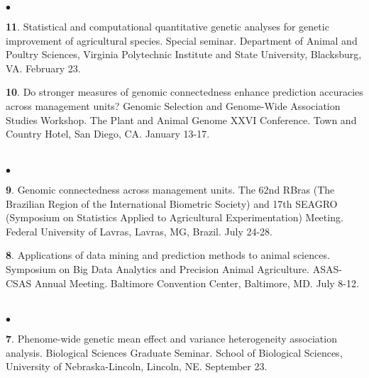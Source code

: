\documentclass[margin,line,10pt]{res}
\newenvironment{list2}{
  \begin{list}{$\bullet$}{%
      \setlength{\itemsep}{0in}
      \setlength{\parsep}{0in} \setlength{\parskip}{0in}
      \setlength{\topsep}{0in} \setlength{\partopsep}{0in} 
      \setlength{\leftmargin}{0.2in}}}{\end{list}}
\begin{document}
\begin{resume}
\begin{list2}
    \vspace{0.5cm}
    
\item [{\bf 11}.]  Statistical and computational quantitative genetic analyses for genetic improvement of agricultural species. Special seminar.  Department of Animal and Poultry Sciences, Virginia Polytechnic Institute and State University, Blacksburg, VA. February 23.

  \vspace{0.5cm}
  
\item [{\bf 10}.] Do stronger measures of genomic connectedness enhance prediction accuracies across management units?  Genomic Selection and Genome-Wide Association Studies Workshop. The Plant and Animal Genome XXVI Conference. Town and Country Hotel, San Diego, CA. January 13-17. 
  
\end{list2}


\section{}
\begin{list2}
\item [{\bf 9}.] Genomic connectedness across management units. The 62nd RBras (The Brazilian Region of the International Biometric Society) and 17th SEAGRO (Symposium on Statistics Applied to Agricultural Experimentation) Meeting. Federal University of Lavras, Lavras, MG, Brazil. July 24-28. 
  
  \vspace{0.5cm}
  
  \item [{\bf 8}.] Applications of data mining and prediction methods to animal sciences. Symposium on Big Data Analytics and Precision Animal Agriculture. ASAS-CSAS Annual Meeting. Baltimore Convention Center, Baltimore, MD. July 8-12. 
  
\end{list2}



\section{}
\begin{list2}
\item [{\bf 7}.] Phenome-wide genetic mean effect and variance heterogeneity association analysis. Biological Sciences Graduate Seminar. School of Biological Sciences, University of Nebraska-Lincoln, Lincoln, NE. September 23.
  

\end{list2}
\end{resume}
\end{document}
